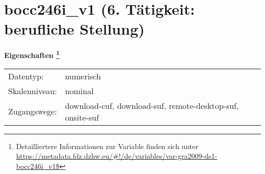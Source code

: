 
    \setcounter{footnote}{0}

    \vspace*{-1.8cm}
	\section{bocc246i\_v1 (6. Tätigkeit: berufliche Stellung)}
	\label{section:bocc246i_v1}



    \vspace*{0.5cm}
    \noindent\textbf{Eigenschaften
	\footnote{Detailliertere Informationen zur Variable finden sich unter
		\url{https://metadata.fdz.dzhw.eu/\#!/de/variables/var-gra2009-ds1-bocc246i_v1$}}}\\
	\begin{tabularx}{\hsize}{@{}lX}
	Datentyp: & numerisch \\
	Skalenniveau: & nominal \\
	Zugangswege: &
	  download-cuf, 
	  download-suf, 
	  remote-desktop-suf, 
	  onsite-suf
 \\
    \end{tabularx}



